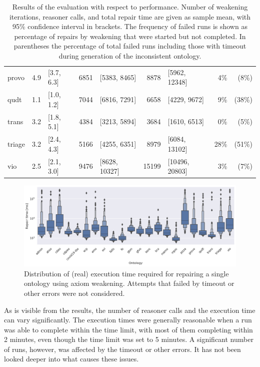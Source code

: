\begin{table}[ht]
\begin{tabular}{|l|r@{ }lr@{ }lr@{ }lr@{ }r|}
    provo & 4.9 & [3.7, 6.3] & 6851 & [5383, 8465] & 8878 & [5962, 12348] & 4\% & (8\%) \\
    qudt & 1.1 & [1.0, 1.2] & 7044 & [6816, 7291] & 6658 & [4229, 9672] & 9\% & (38\%) \\
    trans & 3.2 & [1.8, 5.1] & 4384 & [3213, 5894] & 3684 & [1610, 6513] & 0\% & (5\%) \\
    triage & 3.2 & [2.4, 4.3] & 5166 & [4255, 6351] & 8979 & [6084, 13102] & 28\% & (51\%) \\
    vio & 2.5 & [2.1, 3.0] & 9476 & [8628, 10327] & 15199 & [10496, 20803] & 3\% & (7\%) \\
    \hline
  \end{tabular}
  \caption{Results of the evaluation with respect to performance. Number of weakening iterations, reasoner calls, and total repair time are given as sample mean, with 95\% confidence interval in brackets. The frequency of failed runs is shown as percentage of repairs by weakening that were started but not completed. In parentheses the percentage of total failed runs including those with timeout during generation of the inconsistent ontology.}
  \label{table:results-perf}
\end{table}

\begin{figure}[ht]
  \centering
  \includegraphics[width=\textwidth]{resources/time-ontology-violin.png}
  \caption{Distribution of (real) execution time required for repairing a single ontology using axiom weakening. Attempts that failed by timeout or other errors were not considered.}
  \label{fig:results-perf-time}
\end{figure}

As is visible from the results, the number of reasoner calls and the execution time can vary significantly. The execution times were generally reasonable when a run was able to complete within the time limit, with most of them completing within 2 minutes, even though the time limit was set to 5 minutes. A significant number of runs, however, was affected by the timeout or other errors. It has not been looked deeper into what causes these issues.


